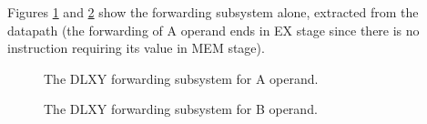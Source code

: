Figures \ref{fig:fwd_a} and \ref{fig:fwd_b} show the forwarding subsystem alone,
extracted from the datapath (the forwarding of A operand ends in EX stage since
there is no instruction requiring its value in MEM stage).
\begin{figure}[H]
	\centering
	\caption{The DLXY forwarding subsystem for A operand.}
	\label{fig:fwd_a}
\end{figure}
\begin{figure}[H]
	\centering
	\caption{The DLXY forwarding subsystem for B operand.}
	\label{fig:fwd_b}
\end{figure}

